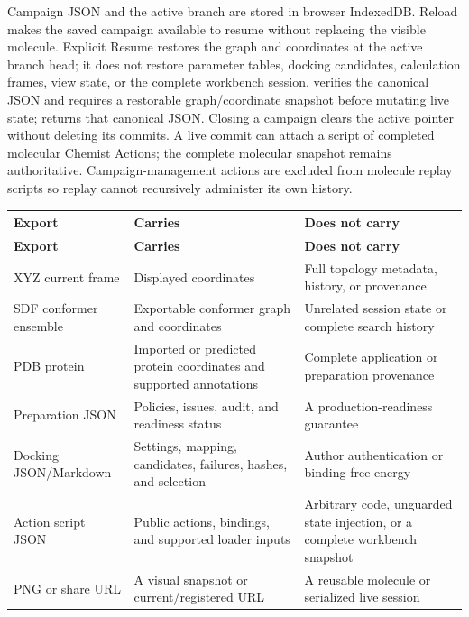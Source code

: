\documentclass[11pt]{article}
\begin{document}
Campaign JSON and the active branch are stored in browser IndexedDB. Reload makes the saved campaign available to resume without replacing the visible molecule. Explicit Resume restores the graph and coordinates at the active branch head; it does not restore parameter tables, docking candidates, calculation frames, view state, or the complete workbench session.  verifies the canonical JSON and requires a restorable graph/coordinate snapshot before mutating live state;  returns that canonical JSON. Closing a campaign clears the active pointer without deleting its commits. A live commit can attach a script of completed molecular Chemist Actions; the complete molecular snapshot remains authoritative. Campaign-management actions are excluded from molecule replay scripts so replay cannot recursively administer its own history.


\begingroup
\footnotesize
\begin{longtable}{@{}p{1.20in}p{2.48in}p{2.92in}@{}}
\toprule
\textbf{Export} & \textbf{Carries} & \textbf{Does not carry}\\
\midrule
\endfirsthead
\toprule
\textbf{Export} & \textbf{Carries} & \textbf{Does not carry}\\
\midrule
\endhead
XYZ current frame & Displayed coordinates & Full topology metadata, history, or provenance\\
SDF conformer ensemble & Exportable conformer graph and coordinates & Unrelated session state or complete search history\\
PDB protein & Imported or predicted protein coordinates and supported annotations & Complete application or preparation provenance\\
Preparation JSON & Policies, issues, audit, and readiness status & A production-readiness guarantee\\
Docking JSON/Markdown & Settings, mapping, candidates, failures, hashes, and selection & Author authentication or binding free energy\\
Action script JSON & Public actions, bindings, and supported loader inputs & Arbitrary code, unguarded state injection, or a complete workbench snapshot\\
PNG or share URL & A visual snapshot or current/registered URL & A reusable molecule or serialized live session\\
\bottomrule
\end{longtable}
\endgroup
\end{document}
